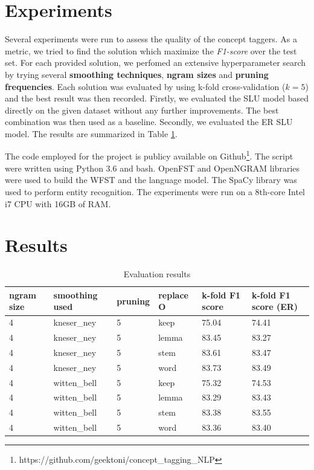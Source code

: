 \documentclass[11pt,a4paper]{article}
\begin{document}
\section{Experiments}

Several experiments were run to assess the quality of 
the concept taggers. As a metric, we tried to find the solution which maximize the \textit{F1-score} over the test set. For each provided solution, we perfomed an extensive hyperparameter search by trying several \textbf{smoothing techniques}, \textbf{ngram sizes} and \textbf{pruning frequencies}. Each solution was evaluated by using k-fold cross-validation ($k=5$) and the best result was then recorded. Firstly, we evaluated the SLU model based directly on the given dataset without any further improvements. The best combination was then used as a baseline. Secondly, we evaluated the ER SLU model. The results are summarized in Table \ref{tab:eval-resuts}.

The code employed for the project is publicy available on Github\footnote{https://github.com/geektoni/concept\_tagging\_NLP}. The script were written using Python 3.6 and bash. OpenFST \cite{openfst} and OpenNGRAM \cite{opengrm} libraries were used to build the WFST and the language model. The SpaCy \cite{spacy2} library was used to perform entity recognition.
The experiments were run on a 8th-core Intel i7 CPU with 16GB of RAM. 

\section{Results}

\begin{table}[h!]
\centering
\caption{Evaluation results}
\label{tab:eval-resuts}
\begin{tabular}{llllll}
\hline
\textbf{ngram size} & \textbf{smoothing used} & \textbf{pruning} & \textbf{replace O} & \textbf{k-fold F1 score} & \textbf{k-fold F1 score (ER)} \\ \hline
4 & kneser\_ney & 5 & keep & 75.04 & 74.41 \\
4 & kneser\_ney & 5 & lemma & 83.45 & 83.27 \\
4 & kneser\_ney & 5 & stem & 83.61 & 83.47 \\
4 & kneser\_ney & 5 & word & 83.73 & 83.49 \\
4 & witten\_bell & 5 & keep & 75.32 & 74.53 \\
4 & witten\_bell & 5 & lemma & 83.29 & 83.43 \\
4 & witten\_bell & 5 & stem & 83.38 & 83.55 \\
4 & witten\_bell & 5 & word & 83.36 & 83.40 \\ \hline
\end{tabular}
\end{table}
\end{document}
